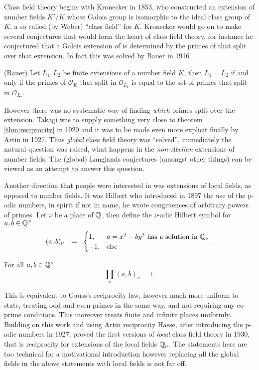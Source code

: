 Class field theory begins with Kronecker in 1853, who constructed an extension of number fields \(K'/K\) whose Galois group is isomorphic to the ideal class group of \(K\), a so called (by Weber) ``class field'' for \(K\). Kronecker would go on to make several conjectures that would form the heart of class field theory, for instance he conjectured that a Galois extension of \Q is determined by the primes of \Z that split over that extension. In fact this was solved by Bauer in 1916
\begin{Theorem}(Bauer)
	Let \(L_1, L_2\) be finite extensions of a number field \(K\), then \(L_1 = L_2\) if and only if the primes of \(\mathcal{O}_K\) that split in \(\mathcal{O}_{L_1}\) is equal to the set of primes that split in \(\mathcal{O}_{L_2}\).
\end{Theorem}
However there was no systematic way of finding \textit{which} primes split over the extension. Takagi was to supply something very close to theorem \ref{thm:reciprocity} in 1920 and it was to be made even more explicit finally by Artin in 1927. Thus \textit{global} class field theory was ``solved'', immediately the natural question was raised, what happens in the \textit{non-Abelian} extensions of number fields. The (global) Langlands conjectures (amongst other things) can be viewed as an attempt to answer this question. 

Another direction that people were interested in was extensions of local fields, as opposed to number fields. It was Hilbert who introduced in 1897 the use of the p-adic numbers, in spirit if not in name, he wrote congruences of arbitrary powers of primes. Let \(\nu\) be a place of \(\Q\), then define the \(\nu\)-adic Hilbert symbol for \(a,b\in \Q^\times\)
\[(a,b)_\nu \defeq \begin{cases}
	1, & a= x^2-by^2 \text{ has a solution in }\Q_\nu\\
	-1, &\text{else}
\end{cases} .\]
\begin{Theorem}
	For all \(	a,b\in \Q^\times\) 
	\[\prod_\nu (a,b)_\nu = 1.\]
\end{Theorem}
This is equivalent to Gauss's reciprocity law, however much more uniform to state, treating odd and even primes in the same way, and not requiring any co-prime conditions. This moreover treats finite and infinite places uniformly. Building on this work and using Artin reciprocity Hasse, after introducing the p-adic numbers in 1927, proved the first versions of \textit{local} class field theory in 1930, that is reciprocity for extensions of the local fields \(\Q_\nu\). The statements here are too technical for a motivational introduction however replacing all the global fields in the above statements with local fields is not far off. 


